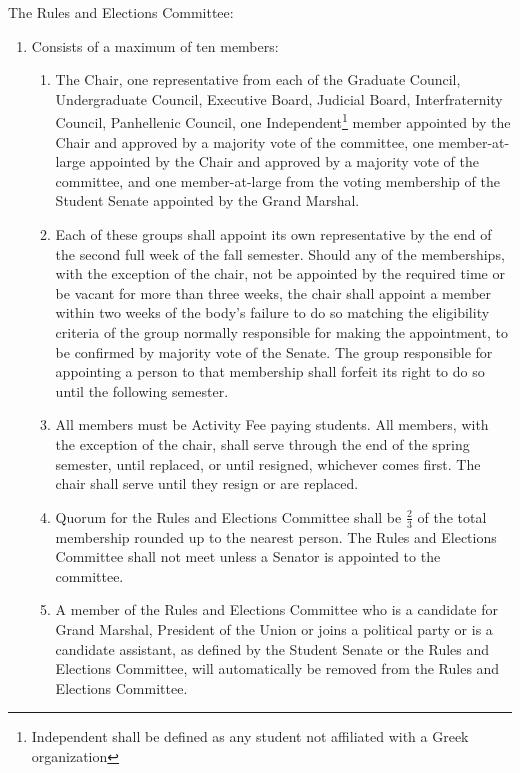 \item The Rules and Elections Committee:
\begin{enumerate}
\item Consists of a maximum of ten members:
\begin{enumerate}
\item The Chair, one representative from each of the Graduate Council, Undergraduate Council, Executive Board, Judicial
Board, Interfraternity Council, Panhellenic Council, one Independent\footnote{Independent shall be defined as any student not affiliated with a Greek organization} member appointed by the Chair and approved
by a majority vote of the committee, one member-at-large appointed by the Chair and approved by a majority vote of
the committee, and one member-at-large from the voting membership of the Student Senate appointed by the Grand
Marshal.
\item Each of these groups shall appoint its own representative by the end of the second full week of the fall semester.
Should any of the memberships, with the exception of the chair, not be appointed by the required time or be vacant
for more than three weeks, the chair shall appoint a member within two weeks of the body’s failure to do so matching the
eligibility criteria of the group normally responsible for making the appointment, to be confirmed by majority vote of the
Senate. The group responsible for appointing a person to that membership shall forfeit its right to do so until the following
semester.
\item All members must be Activity Fee paying students. All members, with the exception of the chair, shall serve through
the end of the spring semester, until replaced, or until resigned, whichever comes first. The chair shall serve until they
resign or are replaced.
\item Quorum for the Rules and Elections Committee shall be $\frac{2}{3}$ of the total membership rounded up to the nearest
person. The Rules and Elections Committee shall not meet unless a Senator is appointed to the committee.
\item A member of the Rules and Elections Committee who is a candidate for Grand Marshal, President of the Union or
joins a political party or is a candidate assistant, as defined by the Student Senate or the Rules and Elections
Committee, will automatically be removed from the Rules and Elections Committee.
\end{enumerate}


\end{enumerate}
